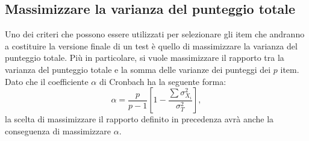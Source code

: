 %
%



\subsection{Massimizzare la varianza del punteggio totale}

Uno dei criteri che possono essere utilizzati per selezionare gli item
    che andranno a costituire la versione finale di un test è quello
    di massimizzare la varianza del punteggio totale.
   Più in particolare, si vuole massimizzare il rapporto tra la
    varianza del  punteggio totale e la somma delle varianze
    dei punteggi dei $p$ item. 
Dato che il coefficiente $\alpha$ di Cronbach ha la seguente forma:
\begin{equation}
\alpha = \frac{p}{p-1}\left[1- \frac{\sum \sigma^2_{X_i}}{\sigma^2_T} \right],
\end{equation}
la scelta di massimizzare il rapporto definito in precedenza avrà
anche la conseguenza di massimizzare $\alpha$. 

